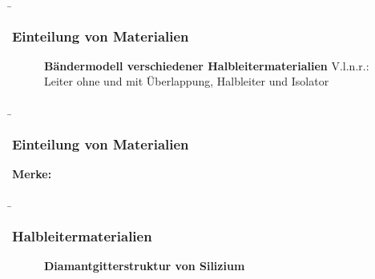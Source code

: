 \begin{frame}
    \b{
    \frametitle{Einteilung von Materialien}
    \begin{figure}[H]
        \centering
        
        \caption{\textbf{Bändermodell verschiedener Halbleitermaterialien} V.l.n.r.: Leiter ohne und mit Überlappung, Halbleiter und Isolator}  
    \end{figure}
    }

\end{frame}

\begin{frame}
    \b{
    \frametitle{Einteilung von Materialien}
    \textbf{Merke:}
    \begin{itemize}
    \end{itemize}}
\end{frame}


\begin{frame}
    \b{
    \frametitle{Halbleitermaterialien}
    \begin{figure}[H]
        \centering
        
        \caption{\textbf{Diamantgitterstruktur von Silizium}}  
    \end{figure}
    }

\end{frame}

